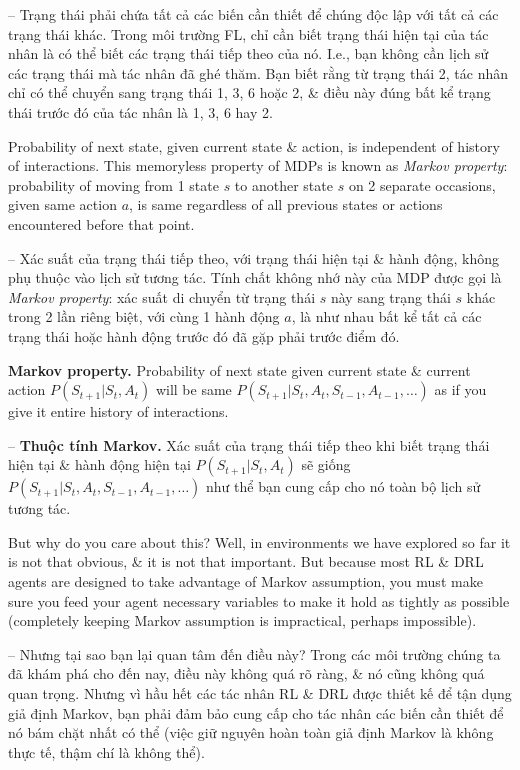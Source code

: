 \documentclass{article}
\begin{document}
\begin{itemize}
\begin{itemize}
        -- Trạng thái phải chứa tất cả các biến cần thiết để chúng độc lập với tất cả các trạng thái khác. Trong môi trường FL, chỉ cần biết trạng thái hiện tại của tác nhân là có thể biết các trạng thái tiếp theo của nó. I.e., bạn không cần lịch sử các trạng thái mà tác nhân đã ghé thăm. Bạn biết rằng từ trạng thái 2, tác nhân chỉ có thể chuyển sang trạng thái 1, 3, 6 hoặc 2, \& điều này đúng bất kể trạng thái trước đó của tác nhân là 1, 3, 6 hay 2.

        Probability of next state, given current state \& action, is independent of history of interactions. This memoryless property of MDPs is known as {\it Markov property}: probability of moving from 1 state $s$ to another state $s$ on 2 separate occasions, given same action $a$, is same regardless of all previous states or actions encountered before that point.

        -- Xác suất của trạng thái tiếp theo, với trạng thái hiện tại \& hành động, không phụ thuộc vào lịch sử tương tác. Tính chất không nhớ này của MDP được gọi là {\it Markov property}: xác suất di chuyển từ trạng thái $s$ này sang trạng thái $s$ khác trong 2 lần riêng biệt, với cùng 1 hành động $a$, là như nhau bất kể tất cả các trạng thái hoặc hành động trước đó đã gặp phải trước điểm đó.

        {\bf Markov property.} Probability of next state given current state \& current action $P(S_{t+1}|S_t,A_t)$ will be same $P(S_{t+1}|S_t,A_t,S_{t-1},A_{t-1},\ldots)$ as if you give it entire history of interactions.

        -- {\bf Thuộc tính Markov.} Xác suất của trạng thái tiếp theo khi biết trạng thái hiện tại \& hành động hiện tại $P(S_{t+1}|S_t,A_t)$ sẽ giống $P(S_{t+1}|S_t,A_t,S_{t-1},A_{t-1},\ldots)$ như thể bạn cung cấp cho nó toàn bộ lịch sử tương tác.

        But why do you care about this? Well, in environments we have explored so far it is not that obvious, \& it is not that important. But because most RL \& DRL agents are designed to take advantage of Markov assumption, you must make sure you feed your agent necessary variables to make it hold as tightly as possible (completely keeping Markov assumption is impractical, perhaps impossible).

        -- Nhưng tại sao bạn lại quan tâm đến điều này? Trong các môi trường chúng ta đã khám phá cho đến nay, điều này không quá rõ ràng, \& nó cũng không quá quan trọng. Nhưng vì hầu hết các tác nhân RL \& DRL được thiết kế để tận dụng giả định Markov, bạn phải đảm bảo cung cấp cho tác nhân các biến cần thiết để nó bám chặt nhất có thể (việc giữ nguyên hoàn toàn giả định Markov là không thực tế, thậm chí là không thể).


\end{itemize}
\end{itemize}
\end{document}
